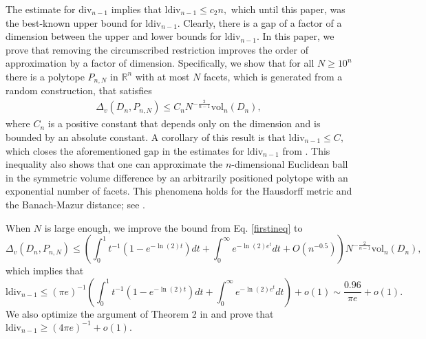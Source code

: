 \documentclass[10pt, twoside, leqno]{article}
\theoremstyle{definition}
\numberwithin{equation}{section}
\newcommand{\R}{\mathbb{R}}
\newcommand{\NN}{N^{-\frac 2{n-1} }}
\begin{document}
The estimate for $ \textrm{div}_{n-1} $ implies that $\textrm{ldiv}_{n-1} \leq c_2n,$ which until this paper, was the best-known upper bound for $ \textrm{ldiv}_{n-1} $. Clearly, there is a gap of a factor of a dimension between the upper and lower bounds for $\textrm{ldiv}_{n-1}$. In this paper, we prove that removing the circumscribed restriction improves the order of approximation by a factor of dimension. Specifically, we show that for all $ N \geq 10^n$ there is a polytope $ P_{n,N} $ in $ \R^n $ with at most $ N $ facets, which is generated from a random construction, that satisfies
\begin{align}\label{firstineq}
\Delta_v(D_n, P_{n,N}) \leq C_n\NN\text{vol}_n\left(D_n\right), 
\end{align} 
where $ C_n$ is a positive constant that depends only on the dimension and is bounded by an absolute constant. A corollary of this result is that  $ \textrm{ldiv}_{n-1} \leq C,$ which closes the aforementioned gap in the estimates for $\textrm{ldiv}_{n-1}$ from \cite{ludwig1999asymptotic,Lud06}. 
This inequality also shows that one can approximate the $ n$-dimensional Euclidean ball in the symmetric volume difference by an arbitrarily positioned polytope with an exponential number of facets. This phenomena holds for the Hausdorff metric and the Banach-Mazur distance; see \cite{artstein2015asymptotic,aubrun2017alice}. 

When $ N $ is large enough, we improve the bound from Eq. \eqref{firstineq} to
\[
	\Delta_v(D_n, P_{n,N}) \leq \left(\int_{0}^{1}t^{-1}(1-e^{-\ln(2)t})dt + \int_{0}^{\infty}e^{-\ln(2)e^{t}}dt+O(n^{-0.5})\right)\NN\text{vol}_n\left(D_n\right),
\]   
which implies that  
\[
\text{ldiv}_{n-1} \leq (\pi e)^{-1}\left(\int_{0}^{1}t^{-1}(1-e^{-\ln(2)t})dt+\int_{0}^{\infty}e^{-\ln(2)e^{t}}dt\right) + o(1) \sim \frac{0.96}{\pi e}+o(1).
\]  
We also optimize the argument of Theorem 2 in \cite{Lud06} and prove that $ \text{ldiv}_{n-1} \geq (4\pi e)^{-1}+o(1).$ 
\end{document}
